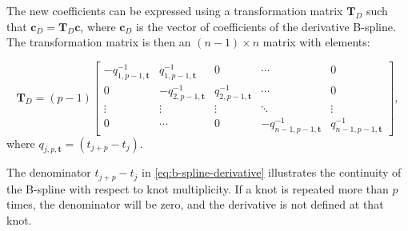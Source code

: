 The new coefficients can be expressed using a transformation matrix $\mathbf T_D$ such that $\mathbf{c}_D = \mathbf T_D \mathbf{c}$, where $\mathbf{c}_D$ is the vector of coefficients of the derivative B-spline. The transformation matrix is then an $(n-1) \times n$ matrix with elements:

\begin{equation}
    \mathbf T_D = (p-1) \begin{bmatrix}
        -q_{1,p-1,\mathbf{t}}^{-1} & q_{1,p-1,\mathbf{t}}^{-1} & 0 & \cdots & 0 \\
        0 & -q_{2,p-1,\mathbf{t}}^{-1} & q_{2,p-1,\mathbf{t}}^{-1} & \cdots & 0 \\
        \vdots & \vdots & \vdots & \ddots & \vdots \\
        0 & \cdots & 0 & -q_{n-1,p-1,\mathbf{t}}^{-1} & q_{n-1,p-1,\mathbf{t}}^{-1} 
    \end{bmatrix},
\end{equation}
where $q_{j,p,\mathbf{t}} = (t_{j+p}-t_j)$.


The denominator $t_{j+p}-t_j$ in \cref{eq:b-spline-derivative} illustrates the continuity of the B-spline with respect to knot multiplicity. If a knot is repeated more than $p$ times, the denominator will be zero, and the derivative is not defined at that knot.

